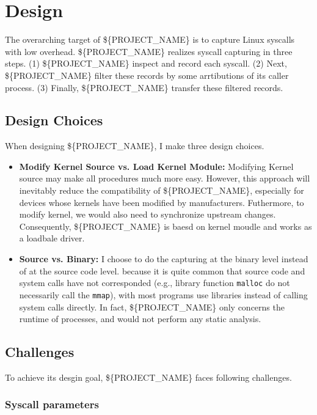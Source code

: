 \section{Design}


The overarching target of \$\{PROJECT\_NAME\} is to capture Linux syscalls with low overhead. \$\{PROJECT\_NAME\} realizes syscall capturing in three steps. (1) \$\{PROJECT\_NAME\} inspect and record each syscall. (2) Next, \$\{PROJECT\_NAME\} filter these records by some arrtibutions of its caller process. (3) Finally, \$\{PROJECT\_NAME\} transfer these filtered records.

\subsection{Design Choices}

When designing \$\{PROJECT\_NAME\}, I make three design choices.

\begin{itemize}
    \item \textbf{Modify Kernel Source vs. Load Kernel Module:} Modifying Kernel source may make all procedures much more easy. However, this approach will inevitably reduce the compatibility of \$\{PROJECT\_NAME\}, especially for devices whose kernels have been modified by manufacturers. Futhermore, to modify kernel, we would also need to synchronize upstream changes. Consequently, \$\{PROJECT\_NAME\} is baesd on kernel moudle and works as a loadbale driver.
    \item \textbf{Source vs. Binary: }  I choose to do the capturing at
    the binary level instead of at the source code level. because it is quite common that source code and system calls have not corresponded (e.g., library function \texttt{malloc} do not necessarily call the \texttt{mmap}), with most programs use libraries instead of calling system calls directly. In fact, \$\{PROJECT\_NAME\} only concerns the runtime of processes, and would not perform any static analysis.
\end{itemize}

\subsection{Challenges}

To achieve its desgin goal, \$\{PROJECT\_NAME\} faces following challenges.


\subsubsection{Syscall parameters}

